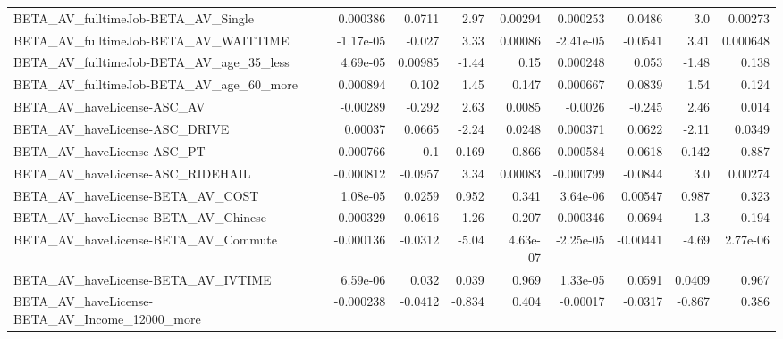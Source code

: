 \begin{tabular}{lrrrrrrrr}
BETA\_AV\_fulltimeJob-BETA\_AV\_Single                 &    0.000386 &       0.0711 &      2.97 &  0.00294 &   0.000253 &      0.0486 &          3.0 &       0.00273 \\
BETA\_AV\_fulltimeJob-BETA\_AV\_WAITTIME               &   -1.17e-05 &       -0.027 &      3.33 &  0.00086 &  -2.41e-05 &     -0.0541 &         3.41 &      0.000648 \\
BETA\_AV\_fulltimeJob-BETA\_AV\_age\_35\_less            &    4.69e-05 &      0.00985 &     -1.44 &     0.15 &   0.000248 &       0.053 &        -1.48 &         0.138 \\
BETA\_AV\_fulltimeJob-BETA\_AV\_age\_60\_more            &    0.000894 &        0.102 &      1.45 &    0.147 &   0.000667 &      0.0839 &         1.54 &         0.124 \\
BETA\_AV\_haveLicense-ASC\_AV                         &    -0.00289 &       -0.292 &      2.63 &   0.0085 &    -0.0026 &      -0.245 &         2.46 &         0.014 \\
BETA\_AV\_haveLicense-ASC\_DRIVE                      &     0.00037 &       0.0665 &     -2.24 &   0.0248 &   0.000371 &      0.0622 &        -2.11 &        0.0349 \\
BETA\_AV\_haveLicense-ASC\_PT                         &   -0.000766 &         -0.1 &     0.169 &    0.866 &  -0.000584 &     -0.0618 &        0.142 &         0.887 \\
BETA\_AV\_haveLicense-ASC\_RIDEHAIL                   &   -0.000812 &      -0.0957 &      3.34 &  0.00083 &  -0.000799 &     -0.0844 &          3.0 &       0.00274 \\
BETA\_AV\_haveLicense-BETA\_AV\_COST                   &    1.08e-05 &       0.0259 &     0.952 &    0.341 &   3.64e-06 &     0.00547 &        0.987 &         0.323 \\
BETA\_AV\_haveLicense-BETA\_AV\_Chinese                &   -0.000329 &      -0.0616 &      1.26 &    0.207 &  -0.000346 &     -0.0694 &          1.3 &         0.194 \\
BETA\_AV\_haveLicense-BETA\_AV\_Commute                &   -0.000136 &      -0.0312 &     -5.04 & 4.63e-07 &  -2.25e-05 &    -0.00441 &        -4.69 &      2.77e-06 \\
BETA\_AV\_haveLicense-BETA\_AV\_IVTIME                 &    6.59e-06 &        0.032 &     0.039 &    0.969 &   1.33e-05 &      0.0591 &       0.0409 &         0.967 \\
BETA\_AV\_haveLicense-BETA\_AV\_Income\_12000\_more      &   -0.000238 &      -0.0412 &    -0.834 &    0.404 &   -0.00017 &     -0.0317 &       -0.867 &         0.386 \\

\end{tabular}
